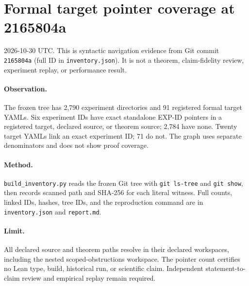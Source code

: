 \documentclass[10pt]{article}
\begin{document}
\section*{Formal target pointer coverage at 2165804a}
2026-10-30 UTC. This is syntactic navigation evidence from Git commit
\texttt{2165804a} (full ID in \texttt{inventory.json}). It is not a theorem,
claim-fidelity review, experiment replay, or performance result.

\begin{center}\end{center}

\paragraph{Observation.} The frozen tree has 2,790 experiment directories and
91 registered formal target YAMLs. Six experiment IDs have exact standalone
EXP-ID pointers in a registered target, declared source, or theorem source;
2,784 have none. Twenty target YAMLs link an exact experiment ID; 71 do not.
The graph uses separate denominators and does not show proof coverage.

\paragraph{Method.} \texttt{build\_inventory.py} reads the frozen Git tree with
\texttt{git ls-tree} and \texttt{git show}, then records scanned path and SHA-256
for each literal witness. Full counts, linked IDs, hashes, tree IDs, and the
reproduction command are in \texttt{inventory.json} and \texttt{report.md}.

\paragraph{Limit.} All declared source and theorem paths resolve in their
declared workspaces, including the nested scoped-obstructions workspace.
The pointer count certifies no Lean type, build, historical run, or scientific
claim. Independent statement-to-claim review and empirical replay remain required.
\end{document}
